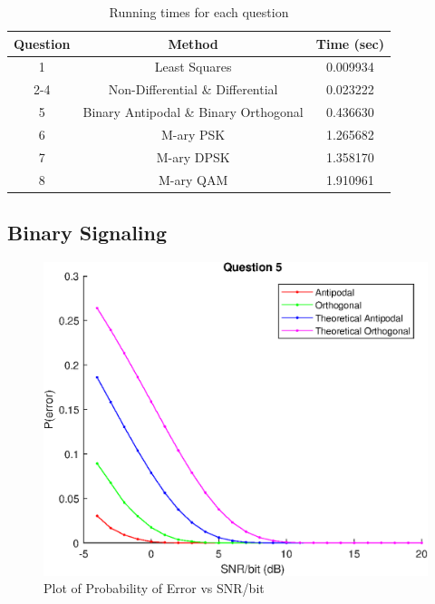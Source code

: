 \documentclass[12pt]{report}
\begin{document}
\begin{table}[H]
    \centering
    \begin{tabular}{|| c | c | c ||} 
    \hline
        Question & Method & Time (sec) \\ [0.5ex]
        \hline
        1 & Least Squares & 0.009934 \\
        \hline
        2-4 & Non-Differential \& Differential & 0.023222 \\
        \hline
        5 & Binary Antipodal \& Binary Orthogonal & 0.436630 \\
        \hline
        6 & M-ary PSK & 1.265682 \\
        \hline
        7 & M-ary DPSK & 1.358170 \\
        \hline
        8 & M-ary QAM & 1.910961 \\
        \hline
    \end{tabular}
    \caption{Running times for each question}
    \label{tab:Run Times}
\end{table}

\newpage

\subsection{Binary Signaling}

\begin{figure}[!htb]
    \begin{center}
    \includegraphics[scale=1]{Question5}
    \caption{Plot of Probability of Error vs SNR/bit}
    \end{center}
\end{figure}
\end{document}
